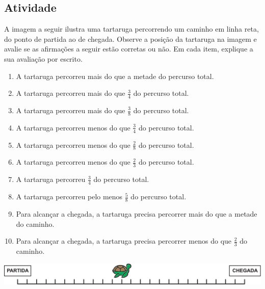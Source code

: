 \begin{center}
\end{center}


\subsection{Atividade}

A imagem a seguir ilustra uma tartaruga percorrendo um caminho em linha reta, do ponto de partida ao de chegada. Observe a posição da tartaruga na imagem e avalie se as afirmações a seguir estão corretas ou não. Em cada item, explique a sua avaliação por escrito.
\begin{enumerate} [\quad a)] %
  \item     A tartaruga percorreu mais do que a metade do percurso total.
  \item     A tartaruga percorreu mais do que     $\frac{3}{4}$     do percurso total.
  \item     A tartaruga percorreu mais do que     $\frac{3}{8}$     do percurso total.
  \item     A tartaruga percorreu menos do que     $\frac{3}{4}$     do percurso total.
  \item     A tartaruga percorreu menos do que     $\frac{2}{8}$     do percurso total.
  \item     A tartaruga percorreu menos do que     $\frac{2}{3}$     do percurso total.
  \item     A tartaruga percorreu     $\frac{3}{4}$     do percurso total.
  \item     A tartaruga percorreu pelo menos     $\frac{5}{8}$     do percurso total.
  \item     Para alcançar a chegada, a tartaruga precisa percorrer mais do que a metade do caminho.
  \item     Para alcançar a chegada, a tartaruga precisa percorrer menos do que     $\frac{2}{3}$     do caminho.
\end{enumerate} %

  \noindent\includegraphics[width=\textwidth, keepaspectratio]{../figuras/licao03/ativ9_fig01.png}

